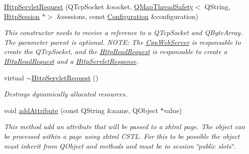 \begin{DoxyCompactItemize}
\item 
\mbox{\label{class_http_servlet_request_aabbebe88ee8094555c82cea8fa2674f0}} 
\hyperlink{class_http_servlet_request_aabbebe88ee8094555c82cea8fa2674f0}{Http\+Servlet\+Request} (Q\+Tcp\+Socket \&socket, \hyperlink{class_q_map_thread_safety}{Q\+Map\+Thread\+Safety}$<$ Q\+String, \hyperlink{class_http_session}{Http\+Session} $\ast$$>$ \&sessions, const \hyperlink{class_configuration}{Configuration} \&configuration)
\begin{DoxyCompactList}\small\item\em This constructor needs to receive a reference to a Q\+Tcp\+Socket and Q\+Byte\+Array. The parameter parent is optional. N\+O\+TE\+: The \hyperlink{class_cpp_web_server}{Cpp\+Web\+Server} is responsable to create the Q\+Tcp\+Socket, and the \hyperlink{class_http_read_request}{Http\+Read\+Request} is responsable to create a \hyperlink{class_http_read_request}{Http\+Read\+Request} and a \hyperlink{class_http_servlet_response}{Http\+Servlet\+Response}. \end{DoxyCompactList}\item 
\mbox{\label{class_http_servlet_request_aa3ed01e89a6d5390e61c0b0f3e6f83c2}} 
virtual \hyperlink{class_http_servlet_request_aa3ed01e89a6d5390e61c0b0f3e6f83c2}{$\sim$\+Http\+Servlet\+Request} ()
\begin{DoxyCompactList}\small\item\em Destroys dynamically allocated resources. \end{DoxyCompactList}\item 
\mbox{\label{class_http_servlet_request_a2537c9716161ea25d83e2aea5b26a945}} 
void \hyperlink{class_http_servlet_request_a2537c9716161ea25d83e2aea5b26a945}{add\+Attribute} (const Q\+String \&name, Q\+Object $\ast$value)
\begin{DoxyCompactList}\small\item\em This method add an attribute that will be passed to a xhtml page. The object can be processed within a page using xhtml C\+S\+TL. For this to be possible the object must inherit from Q\+Object and methods and must be in session \char`\"{}public slots\char`\"{}. \end{DoxyCompactList}\item 
\mbox{\label{class_http_servlet_request_ac059e7124ee117616c1040cbd8ef980d}} 
$$
\end{DoxyCompactItemize}
